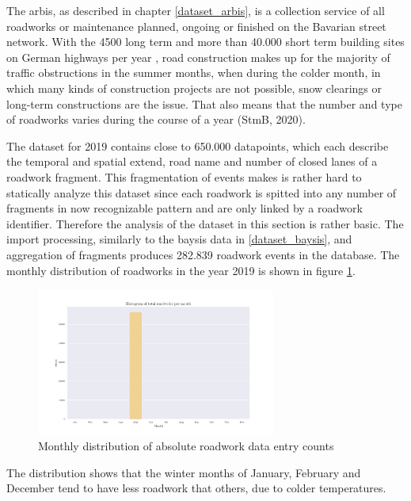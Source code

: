 \documentclass[a4paper,12pt]{report}
\begin{document}
The \acrfull{arbis}, as described in chapter \ref{dataset_arbis}, is a collection service of all roadworks or maintenance planned, ongoing or finished on the Bavarian street network. With the 4500 long term and more than 40.000 short term building sites on German highways per year \cite{LAPID2018,Stmi2020}, road construction makes up for the majority of traffic obstructions in the summer months, when during the colder month, in which many kinds of construction projects are not possible, snow clearings or long-term constructions are the issue. That also means that the number and type of roadworks varies during the course of a year (StmB, 2020).

The dataset for 2019 contains close to 650.000 datapoints, which each describe the temporal and spatial extend, road name and number of closed lanes of a roadwork fragment. This fragmentation of events makes is rather hard to statically analyze this dataset since each roadwork is spitted into any number of fragments in now recognizable pattern and are only linked by a roadwork identifier. Therefore the analysis of the dataset in this section is rather basic. The import processing, similarly to the \acrshort{baysis} data in \ref{dataset_baysis}, and aggregation of fragments produces 282.839 roadwork events in the database. The monthly distribution of roadworks in the year 2019 is shown in figure \ref{img:arbis_dataset_monthly_absolute}.

\begin{figure}[h]
	\centering
	\includegraphics[width=0.7\textwidth]{../CorrAnalysis/data/ArbIS/01_dataset/plots/arbis_dataset_hist_month}
	\caption{Monthly distribution of absolute roadwork data entry counts}
	\label{img:arbis_dataset_monthly_absolute}
\end{figure}

The distribution shows that the winter months of January, February and December tend to have less roadwork that others, due to colder temperatures.
\end{document}
